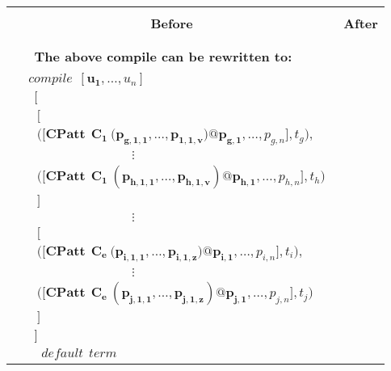 \documentclass[11pt]{article}
\begin{document}
\begin{table}
\begin{center}
\begin{tabular}{|c|c|} \hline
{}& {}\\
{\bf Before} & {\bf After} \\ 
{}& {}\\
\hline
\begin{minipage}{2.6in}
{
\begin{align*} 
&compile~~[\mathbf{u_1},\ldots,u_n] \\
&~~ \Big[~\Big[\\
&~~~\Big(\Big[\mathbf{CPatt~~C_c~\big(p_{1,1,1},\ldots,p_{1,1,x}\big)@p_{1,1}},\ldots, p_{1,n}\Big],t_1\Big), \\
&\qquad \qquad \qquad\qquad \vdots\qquad\qquad  \\ 
&~~~\Big(\Big[\mathbf{CPatt~~C_d~(p_{m,1,1},\ldots,p_{m,1,y})@p_{m,1}},\ldots, p_{m,n}\Big],t_m\Big) \\
&\quad \Big]~\Big]\\
&\quad default~~term
\end{align*}
~~\\
{\bf The above compile can be rewritten to:} ~~\\
\begin{align*} 
&compile~~[\mathbf{u_1},\ldots,u_n] \\
&~~ \Big[\\ 
&~~~\Big[\\
&~~~\Big(\Big[\mathbf{CPatt~~C_1~\big(p_{g,1,1},\ldots,p_{1,1,v}\big)@p_{g,1}},\ldots, p_{g,n}\Big],t_g\Big), \\
&\qquad \qquad \qquad\qquad \vdots  \\ 
&~~~\Big(\Big[\mathbf{CPatt~~C_1~(p_{h,1,1},\ldots,p_{h,1,v})@p_{h,1}},\ldots, p_{h,n}\Big],t_h\Big) \\
&~~~\Big] \\
&\qquad \qquad \qquad\qquad \vdots  \\ 
&~~~\Big[\\
&~~~\Big(\Big[\mathbf{CPatt~~C_e~\big(p_{i,1,1},\ldots,p_{i,1,z}\big)@p_{i,1}},\ldots, p_{i,n}\Big],t_i\Big), \\
&\qquad \qquad \qquad\qquad \vdots  \\ 
&~~~\Big(\Big[\mathbf{CPatt~~C_e~(p_{j,1,1},\ldots,p_{j,1,z})@p_{j,1}},\ldots, p_{j,n}\Big],t_j\Big) \\
&~~~\Big] \\
&~~\Big]\\
&\quad default~~term
\end{align*}
}
\end{minipage}
\end{tabular}
\end{center}
\end{table}
\end{document}
